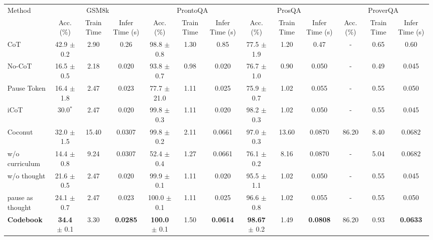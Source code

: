 \begin{table}[t]
\centering
\tiny
\begin{tabular}{lcccccccccccc}
\toprule
\multirow{2}{*}{Method} 
& \multicolumn{3}{c}{GSM8k} 
& \multicolumn{3}{c}{ProntoQA} 
& \multicolumn{3}{c}{ProsQA} 
& \multicolumn{3}{c}{ProverQA} \\
\cmidrule(lr){2-4} 
\cmidrule(lr){5-7} 
\cmidrule(lr){8-10} 
\cmidrule(lr){11-13}
& Acc. (\%) & Train Time & Infer Time (s)
& Acc. (\%) & Train Time & Infer Time (s)
& Acc. (\%) & Train Time & Infer Time (s)
& Acc. (\%) & Train Time & Infer Time (s) \\
\midrule

CoT 
& 42.9 $\pm$ 0.2 & 2.90 & 0.26
& 98.8 $\pm$ 0.8 & 1.30 & 0.85
& 77.5 $\pm$ 1.9 & 1.20 & 0.47
& - & 0.65 & 0.60 \\

No-CoT 
& 16.5 $\pm$ 0.5 & 2.18 & 0.020
& 93.8 $\pm$ 0.7 & 0.98 & 0.020
& 76.7 $\pm$ 1.0 & 0.90 & 0.050
& - & 0.49 & 0.045 \\

Pause Token 
& 16.4 $\pm$ 1.8 & 2.47 & 0.023
& 77.7 $\pm$ 21.0 & 1.11 & 0.025
& 75.9 $\pm$ 0.7 & 1.02 & 0.055
& - & 0.55 & 0.050 \\

iCoT 
& 30.0$^{*}$ & 2.47 & 0.020
& 99.8 $\pm$ 0.3 & 1.11 & 0.020
& 98.2 $\pm$ 0.3 & 1.02 & 0.050
& - & 0.55 & 0.045 \\

\midrule

Coconut 
& 32.0 $\pm$ 1.5 & 15.40 & 0.0307
& 99.8 $\pm$ 0.2 & 2.11 & 0.0661
& 97.0 $\pm$ 0.3 & 13.60 & 0.0870
& 86.20 & 8.40 & 0.0682 \\

\quad w/o curriculum 
& 14.4 $\pm$ 0.8 & 9.24 & 0.0307
& 52.4 $\pm$ 0.4 & 1.27 & 0.0661
& 76.1 $\pm$ 0.2 & 8.16 & 0.0870
& - & 5.04 & 0.0682 \\

\quad w/o thought 
& 21.6 $\pm$ 0.5 & 2.47 & 0.020
& 99.9 $\pm$ 0.1 & 1.11 & 0.020
& 95.5 $\pm$ 1.1 & 1.02 & 0.050
& - & 0.55 & 0.045 \\

\quad pause as thought 
& 24.1 $\pm$ 0.7 & 2.47 & 0.023
& 100.0 $\pm$ 0.1 & 1.11 & 0.025
& 96.6 $\pm$ 0.8 & 1.02 & 0.055
& - & 0.55 & 0.050 \\

\midrule

\textbf{Codebook} 
& \textbf{34.4} $\pm$ 0.1 & 3.30 & \textbf{0.0285}
& \textbf{100.0} $\pm$ 0.1 & 1.50 & \textbf{0.0614}
& \textbf{98.67} $\pm$ 0.2 & 1.49 & \textbf{0.0808}
& 86.20 & 0.93 & \textbf{0.0633} \\


\end{tabular}
\end{table}
